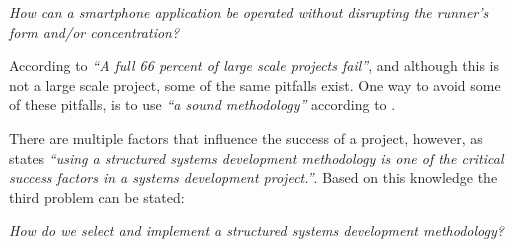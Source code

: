 \begin{center}
\textit{How can a smartphone application be operated without disrupting the runner's form and/or concentration?}
\end{center}
\pagebreak


\noindent According to \citet{gartner:failure} \textit{``A full 66 percent of large scale projects fail”}, and although this is not a large scale project, some of the same pitfalls exist.
One way to avoid some of these pitfalls, is to use \textit{``a sound methodology”} according to \citet{dorsey:methodologyReason}.

There are multiple factors that influence the success of a project, however, as \citet{dorsey:methodologyReason} states \textit{``using a structured systems development methodology is one of the critical success factors in a	systems development project.”}.
Based on this knowledge the third problem can be stated:

\begin{center}
	\textit{How do we select and implement a structured systems development methodology?}
\end{center}